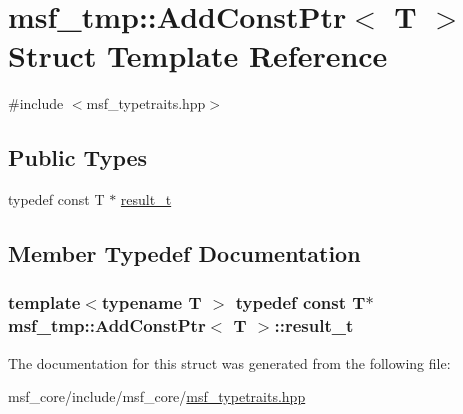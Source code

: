 \hypertarget{structmsf__tmp_1_1AddConstPtr}{\section{msf\-\_\-tmp\-:\-:Add\-Const\-Ptr$<$ T $>$ Struct Template Reference}
\label{structmsf__tmp_1_1AddConstPtr}
}


{\ttfamily \#include $<$msf\-\_\-typetraits.\-hpp$>$}

\subsection*{Public Types}
\begin{DoxyCompactItemize}
\item 
typedef const T $\ast$ \hyperlink{structmsf__tmp_1_1AddConstPtr_ac8ecd5117ac2c0151b69730c134d41bb}{result\-\_\-t}
\end{DoxyCompactItemize}


\subsection{Member Typedef Documentation}
\hypertarget{structmsf__tmp_1_1AddConstPtr_ac8ecd5117ac2c0151b69730c134d41bb}{
\subsubsection[{result\-\_\-t}]{\setlength{\rightskip}{0pt plus 5cm}template$<$typename T $>$ typedef const T$\ast$ {\bf msf\-\_\-tmp\-::\-Add\-Const\-Ptr}$<$ T $>$\-::{\bf result\-\_\-t}}}\label{structmsf__tmp_1_1AddConstPtr_ac8ecd5117ac2c0151b69730c134d41bb}


The documentation for this struct was generated from the following file\-:\begin{DoxyCompactItemize}
\item 
msf\-\_\-core/include/msf\-\_\-core/\hyperlink{msf__typetraits_8hpp}{msf\-\_\-typetraits.\-hpp}\end{DoxyCompactItemize}
